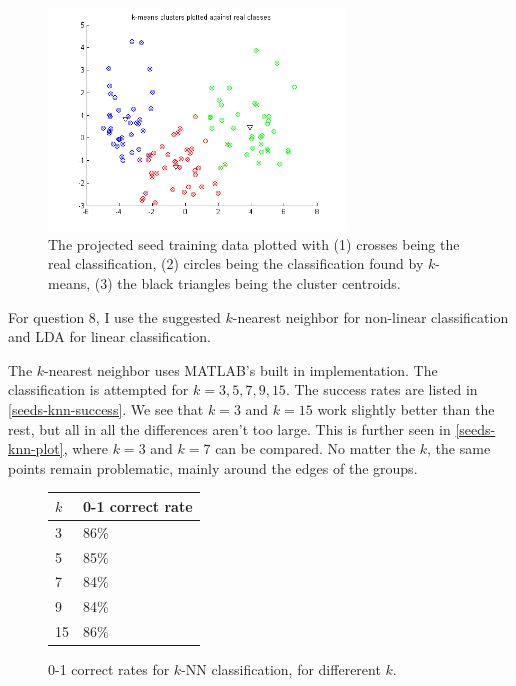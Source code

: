 \documentclass[11pt,a4paper]{article}
\begin{document}
\begin{figure}[h!]
    \centering
    \includegraphics[width=0.7\textwidth]{images/seeds-kmeans}
    \caption{The projected seed training data plotted with (1) crosses being
        the real classification, (2) circles being the classification found by
        $k$-means, (3) the black triangles being the cluster centroids.}
    \label{seeds-kmeans}
\end{figure}

For question 8, I use the suggested $k$-nearest neighbor for non-linear
classification and LDA for linear classification.

The $k$-nearest neighbor uses MATLAB's built in implementation. The
classification is attempted for $k = 3, 5, 7, 9, 15$. The success rates are
listed in \autoref{seeds-knn-success}. We see that $k = 3$ and $k = 15$ work
slightly better than the rest, but all in all the differences aren't too
large. This is further seen in \autoref{seeds-knn-plot}, where $k=3$ and $k=7$
can be compared. No matter the $k$, the same points remain problematic, mainly
around the edges of the groups.

\begin{figure}[h!]
    \centering
    \begin{tabular}{|l|l|}
        \hline
        $k$ & 0-1 correct rate \\
        \hline
        3  & 86\% \\ 
        5  & 85\% \\
        7  & 84\% \\
        9  & 84\% \\
        15 & 86\% \\
        \hline
    \end{tabular}
    \caption{0-1 correct rates for $k$-NN classification, for differerent $k$.}
    \label{seeds-knn-success}
\end{figure}
\end{document}
